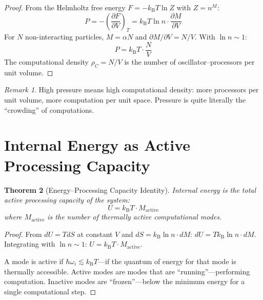 \documentclass[twocolumn,10pt,a4paper]{article}
\theoremstyle{plain}
\newtheorem{theorem}{Theorem}[section]
\theoremstyle{definition}
\theoremstyle{remark}
\newtheorem{remark}[theorem]{Remark}
\newcommand{\kB}{k_{\mathrm{B}}}
\begin{document}
\begin{proof}
From the Helmholtz free energy $F = -\kB T \ln Z$ with $Z = n^M$:
\begin{equation}
    P = -\left(\frac{\partial F}{\partial V}\right)_T = \kB T \ln n \cdot \frac{\partial M}{\partial V}
\end{equation}
For $N$ non-interacting particles, $M = \alpha N$ and $\partial M/\partial V = N/V$. With $\ln n \sim 1$:
\begin{equation}
    P = \kB T \cdot \frac{N}{V}
\end{equation}
The computational density $\rho_C = N/V$ is the number of oscillator--processors per unit volume.
\end{proof}

\begin{remark}
High pressure means high computational density: more processors per unit volume, more computation per unit space. Pressure is quite literally the ``crowding'' of computations.
\end{remark}

\section{Internal Energy as Active Processing Capacity}
\label{sec:energy_capacity}

\begin{theorem}[Energy--Processing Capacity Identity]
\label{thm:energy_capacity}
Internal energy is the total active processing capacity of the system:
\begin{equation}
\boxed{U = \kB T \cdot M_{\mathrm{active}}}
\end{equation}
where $M_{\mathrm{active}}$ is the number of thermally active computational modes.
\end{theorem}

\begin{proof}
From $dU = TdS$ at constant $V$ and $dS = \kB \ln n \cdot dM$: $dU = T\kB \ln n \cdot dM$. Integrating with $\ln n \sim 1$: $U = \kB T \cdot M_{\mathrm{active}}$.

A mode is active if $\hbar\omega_i \lesssim \kB T$---if the quantum of energy for that mode is thermally accessible. Active modes are modes that are ``running''---performing computation. Inactive modes are ``frozen''---below the minimum energy for a single computational step.
\end{proof}
\end{document}
